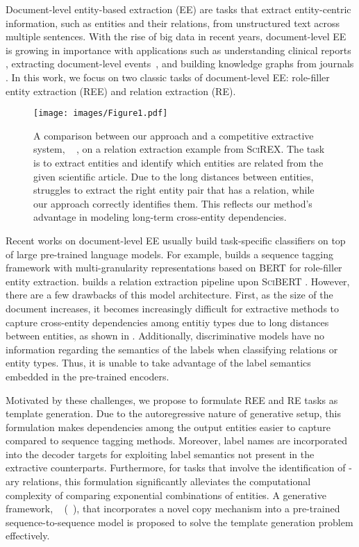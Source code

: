 \documentclass[11pt]{article}
\begin{document}
Document-level entity-based extraction (EE) are tasks that extract entity-centric information, such as entities and their relations, from unstructured text across multiple sentences. With the rise of big data in recent years, document-level EE is growing in importance with applications such as understanding clinical reports \cite{nye2020understanding}, extracting document-level events~\cite{huang2021document}, and building knowledge graphs from journals \cite{wu2020extracting}. In this work, we focus on two classic tasks of document-level EE: role-filler entity extraction (REE) and relation extraction (RE). 

\begin{figure}[t]
    \centering
    \texttt{[image: images/Figure1.pdf]}
    \caption{A comparison between our approach and a competitive extractive system, \scirexpipeline~ \cite{jain-etal-2020-scirex}, on a relation extraction example from \textsc{SciREX}. The task is to extract entities and identify which entities are related from the given scientific article. Due to the long distances between entities, \scirexpipeline~ struggles to extract the right entity pair that has a relation, while our approach correctly identifies them. This reflects our method's advantage in modeling long-term cross-entity dependencies.}
\vspace{-4mm}
    \label{fig:toy}
\end{figure}
Recent works on document-level EE usually build task-specific classifiers on top of large pre-trained language models. For example, \citet{du-cardie-2020-document} builds a sequence tagging framework with multi-granularity representations based on \textsc{BERT} \cite{Devlin_2019} for role-filler entity extraction. \citet{jain-etal-2020-scirex} builds a relation extraction pipeline upon \textsc{SciBERT} \cite{beltagy-etal-2019-scibert}. However, there are a few drawbacks of this model architecture. First, as the size of the document increases, it becomes increasingly difficult for extractive methods to capture cross-entity dependencies among entitiy types due to long distances between entities, as shown in . Additionally, discriminative models have no information regarding the semantics of the labels when classifying relations or entity types. Thus, it is unable to take advantage of the label semantics embedded in the pre-trained encoders. 


Motivated by these challenges, we propose to formulate REE and RE tasks as template generation. Due to the autoregressive nature of generative setup, this formulation makes dependencies among the output entities easier to capture compared to sequence tagging methods. Moreover, label names are incorporated into the decoder targets for exploiting label semantics not present in the extractive counterparts. Furthermore, for tasks that involve the identification of -ary relations, this formulation significantly alleviates the computational complexity of comparing exponential combinations of entities. A generative framework, \modellong~ (\modelshort~), that incorporates a novel copy mechanism into a pre-trained sequence-to-sequence model is proposed to solve the template generation problem effectively. 
\end{document}
